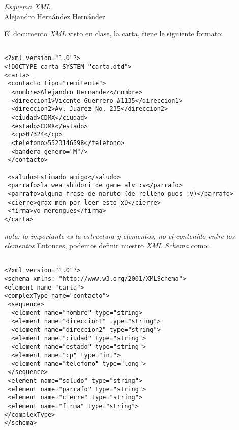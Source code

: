 \documentclass[12pt,letterpaper,spanish]{article}
\begin{document}
\begin{center}
{\huge {\rm {\em Esquema XML}}} \\
\vspace{5mm}
{\Large Alejandro Hern\'andez Hern\'andez}\\
\end{center}
\vspace{5mm}

El documento {\em XML} visto en clase, la carta, tiene le siguiente formato: 
\begin{verbatim}

<?xml version="1.0"?>
<!DOCTYPE carta SYSTEM "carta.dtd">
<carta>
 <contacto tipo="remitente">
  <nombre>Alejandro Hernandez</nombre>
  <direccion1>Vicente Guerrero #1135</direccion1>
  <direccion2>Av. Juarez No. 235</direccion2>
  <ciudad>CDMX</ciudad>
  <estado>CDMX</estado>
  <cp>07324</cp>
  <telefono>5523146598</telefono>
  <bandera genero="M"/>
 </contacto>

 <saludo>Estimado amigo</saludo>
 <parrafo>la wea shidori de game alv :v</parrafo>
 <parrafo>alguna frase de naruto (de relleno pues :v)</parrafo>
 <cierre>grax men por leer esto xD</cierre>
 <firma>yo merengues</firma>
</carta>

\end{verbatim}
\vspace{1mm}
\small{\em{nota: lo importante es la estructura y elementos, no el contenido entre los elementos}}
\newpage
Entonces, podemos definir nuestro {\em XML Schema} como:
 
\begin{verbatim}

<?xml version="1.0"?>
<schema xmlns: "http://www.w3.org/2001/XMLSchema">
<element name "carta">
<complexType name="contacto">
 <sequence>
  <element name="nombre" type="string>
  <element name="direccion1" type="string">
  <element name="direccion2" type="string">
  <element name="ciudad" type="string">
  <element name="estado" type="string">
  <element name="cp" type="int">
  <element name="telefono" type="long">
 </sequence>
 <element name="saludo" type="string">
 <element name="parrafo" type="string">
 <element name="cierre" type="string">
 <element name="firma" type="string">
</complexType>
</schema>

\end{verbatim}

\end{document}
